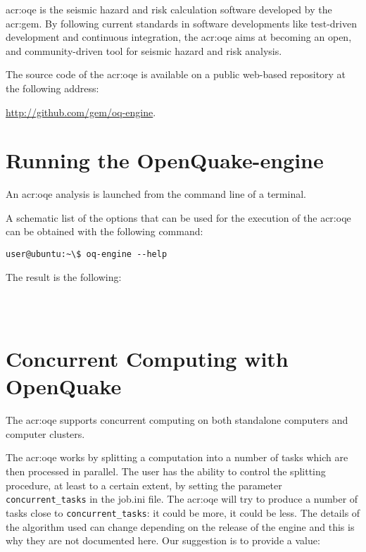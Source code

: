 \glsdesc{acr:oqe} is the seismic hazard and risk calculation software developed by
the \glsdesc{acr:gem}. By following current standards in software
developments like test-driven development and continuous integration, the
\glsdesc{acr:oqe} aims at becoming an open, and community-driven tool for
seismic hazard and risk analysis.

The source code of the \glsdesc{acr:oqe} is available on a public web-based
repository at the following address:

\href{http://github.com/gem/oq-engine}{http://github.com/gem/oq-engine}.


\section{Running the OpenQuake-engine}
\label{sec:running_oq_engine}

An \gls{acr:oqe} analysis is launched from the command line of a terminal.

A schematic list of the options that can be used for the execution of the
\gls{acr:oqe} can be obtained with the following command:

\begin{verbatim}
user@ubuntu:~\$ oq-engine --help
\end{verbatim}

The result is the following:

\inputminted[firstline=1,fontsize=\footnotesize,frame=single]{shell-session}{oqum/help.txt}\\

\section{Concurrent Computing with OpenQuake}
\label{sec:concurrent_tasks}

The \glsdesc{acr:oqe} supports concurrent computing on both standalone
computers and computer clusters.

The \glsdesc{acr:oqe} works by splitting a computation into a number of tasks
which are then processed in parallel. The user has the ability to control the
splitting procedure, at least to a certain extent, by setting the parameter
\Verb+concurrent_tasks+ in the job.ini file. The \glsdesc{acr:oqe} will try to
produce a number of tasks close to \Verb+concurrent_tasks+: it could be more, it
could be less. The details of the algorithm used can change depending on the
release of the engine and this is why they are not documented here. Our
suggestion is to provide a value:


